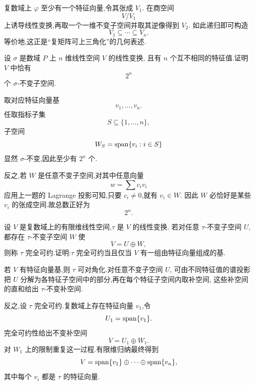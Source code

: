 \begin{solution}
复数域上 $\varphi$ 至少有一个特征向量,令其张成 $V_1$.
在商空间
\[
V/V_1
\]
上诱导线性变换,再取一个一维不变子空间并取其逆像得到 $V_2$.
如此递归即可构造
\[
V_1\subseteq\cdots\subseteq V_n.
\]
等价地,这正是``复矩阵可上三角化''的几何表述.
\end{solution}


\begin{example}[\markstar]
设 $\sigma$ 是数域 $P$ 上 $n$ 维线性空间 $V$ 的线性变换,
且有 $n$ 个互不相同的特征值.证明 $V$ 中恰有
\[
2^n
\]
个 $\sigma$-不变子空间.
\end{example}
\exampleblank

\begin{solution}
取对应特征向量基
\[
v_1,\ldots,v_n.
\]
任取指标子集
\[
S\subseteq\{1,\ldots,n\},
\]
子空间
\[
W_S=\operatorname{span}\{v_i:i\in S\}
\]
显然 $\sigma$-不变,因此至少有 $2^n$ 个.

反之,若 $W$ 是任意不变子空间,对其中任意向量
\[
w=\sum c_i v_i
\]
应用上一题的 Lagrange 投影可知,只要 $c_i\neq0$,就有 $v_i\in W$.
因此 $W$ 必恰好是某些 $v_i$ 的张成空间.故总数正好为
\[
\boxed{2^n}.
\]
\end{solution}


\begin{example}[\markstar]
设 $V$ 是复数域上的有限维线性空间,$\tau$ 是 $V$ 的线性变换.
若对任意 $\tau$-不变子空间 $U$,都存在 $\tau$-不变子空间 $W$ 使
\[
V=U\oplus W,
\]
则称 $\tau$ 完全可约.证明:$\tau$ 完全可约当且仅当 $V$ 有一组由特征向量组成的基.
\end{example}
\exampleblank

\begin{solution}
若 $V$ 有特征向量基,则 $\tau$ 可对角化.对任意不变子空间 $U$,
可由不同特征值的谱投影把 $U$ 分解为各特征子空间中的部分,再在每个特征子空间内取补空间,
这些补空间的直和给出 $\tau$-不变补空间.

反之,设 $\tau$ 完全可约.复数域上存在特征向量 $v_1$,令
\[
U_1=\operatorname{span}\{v_1\}.
\]
完全可约性给出不变补空间
\[
V=U_1\oplus W_1.
\]
对 $W_1$ 上的限制重复这一过程.有限维归纳最终得到
\[
V
=
\operatorname{span}\{v_1\}\oplus\cdots\oplus\operatorname{span}\{v_n\},
\]
其中每个 $v_i$ 都是 $\tau$ 的特征向量.
\end{solution}
